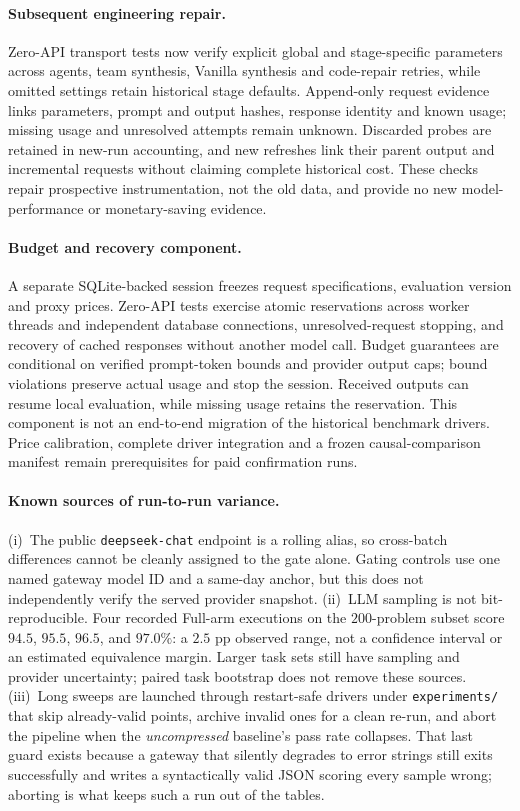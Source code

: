 \documentclass[11pt,twoside,twocolumn,letterpaper]{article}
\begin{document}
\paragraph{Subsequent engineering repair.} Zero-API transport tests now verify explicit global and stage-specific parameters across agents, team synthesis, Vanilla synthesis and code-repair retries, while omitted settings retain historical stage defaults. Append-only request evidence links parameters, prompt and output hashes, response identity and known usage; missing usage and unresolved attempts remain unknown. Discarded probes are retained in new-run accounting, and new refreshes link their parent output and incremental requests without claiming complete historical cost. These checks repair prospective instrumentation, not the old data, and provide no new model-performance or monetary-saving evidence.

\paragraph{Budget and recovery component.} A separate SQLite-backed session freezes request specifications, evaluation version and proxy prices. Zero-API tests exercise atomic reservations across worker threads and independent database connections, unresolved-request stopping, and recovery of cached responses without another model call. Budget guarantees are conditional on verified prompt-token bounds and provider output caps; bound violations preserve actual usage and stop the session. Received outputs can resume local evaluation, while missing usage retains the reservation. This component is not an end-to-end migration of the historical benchmark drivers. Price calibration, complete driver integration and a frozen causal-comparison manifest remain prerequisites for paid confirmation runs.

\paragraph{Known sources of run-to-run variance.}
(i)~The public \texttt{deepseek-chat} endpoint is a rolling alias, so cross-batch differences cannot be cleanly assigned to the gate alone. Gating controls use one named gateway model ID and a same-day anchor, but this does not independently verify the served provider snapshot.
(ii)~LLM sampling is not bit-reproducible. Four recorded Full-arm executions on the $200$-problem subset score $94.5$, $95.5$, $96.5$, and $97.0\%$: a $2.5$ pp observed range, not a confidence interval or an estimated equivalence margin. Larger task sets still have sampling and provider uncertainty; paired task bootstrap does not remove these sources.
(iii)~Long sweeps are launched through restart-safe drivers under \texttt{experiments/} that skip already-valid points, archive invalid ones for a clean re-run, and abort the pipeline when the \emph{uncompressed} baseline's pass rate collapses. That last guard exists because a gateway that silently degrades to error strings still exits successfully and writes a syntactically valid JSON scoring every sample wrong; aborting is what keeps such a run out of the tables.
\end{document}
